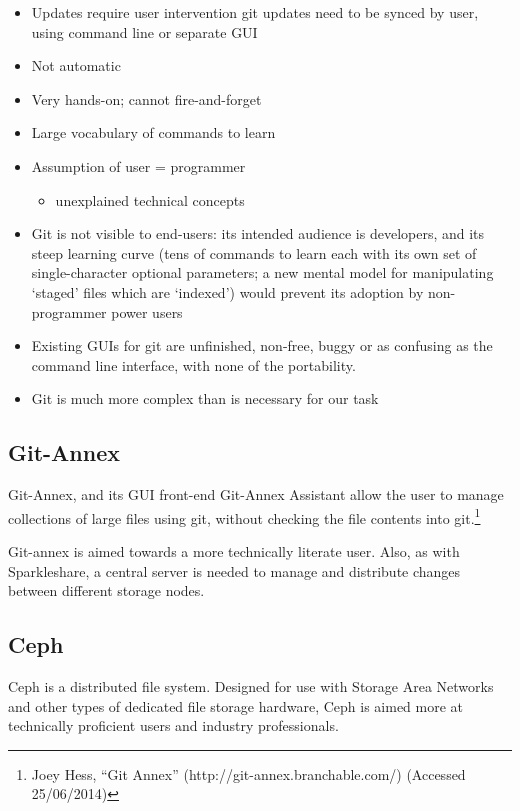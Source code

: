 \documentclass[12pt,a4paper,]{adreport}
\begin{document}
\begin{itemize}
\item
  Updates require user intervention git updates need to be synced by
  user, using command line or separate GUI
\item
  Not automatic
\item
  Very hands-on; cannot fire-and-forget
\item
  Large vocabulary of commands to learn
\item
  Assumption of user = programmer

  \begin{itemize}
  \itemsep1pt\parskip0pt
  \item
    unexplained technical concepts
  \end{itemize}
\item
  Git is not visible to end-users: its intended audience is developers,
  and its steep learning curve (tens of commands to learn each with its
  own set of single-character optional parameters; a new mental model
  for manipulating `staged' files which are `indexed') would prevent its
  adoption by non-programmer power users
\item
  Existing GUIs for git are unfinished, non-free, buggy or as confusing
  as the command line interface, with none of the portability.
\item
  Git is much more complex than is necessary for our task
\end{itemize}

\subsection{Git-Annex}\label{git-annex}

Git-Annex, and its GUI front-end Git-Annex Assistant allow the user to
manage collections of large files using git, without checking the file
contents into git.\footnote{Joey Hess, ``Git Annex''
  (http://git-annex.branchable.com/) (Accessed 25/06/2014)}

Git-annex is aimed towards a more technically literate user. Also, as
with Sparkleshare, a central server is needed to manage and distribute
changes between different storage nodes.

\subsection{Ceph}\label{ceph}

Ceph is a distributed file system. Designed for use with Storage Area
Networks and other types of dedicated file storage hardware, Ceph is
aimed more at technically proficient users and industry professionals.
\end{document}
